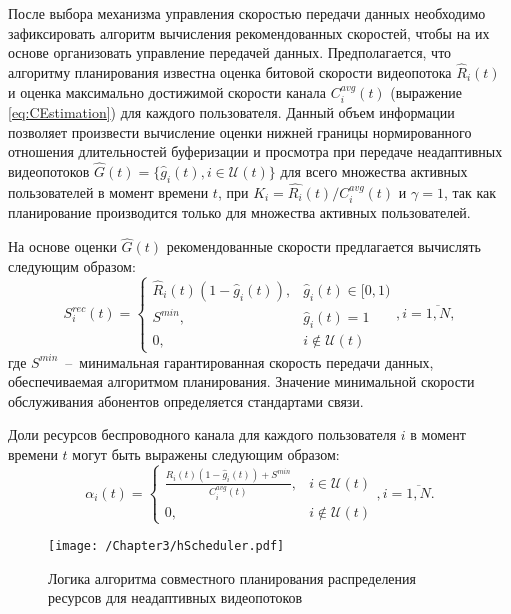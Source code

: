 После выбора механизма управления скоростью передачи данных необходимо зафиксировать алгоритм вычисления рекомендованных скоростей, чтобы на их основе организовать управление передачей данных. Предполагается, что алгоритму планирования известна оценка битовой скорости видеопотока $\hat{R}_i(t)$ и оценка максимально достижимой скорости канала $C^{avg}_i(t)$ (выражение \ref{eq:CEstimation}) для каждого пользователя. Данный объем информации позволяет произвести вычисление оценки нижней границы нормированного отношения длительностей буферизации и просмотра при передаче неадаптивных видеопотоков $\hat{G}(t) = \{\hat{g}_i(t), i \in \mathcal{U}(t)\}$ для всего множества активных пользователей в момент времени $t$, при $K_i = \hat{R_i}(t) / C^{avg}_i(t)$ и $\gamma = 1$, так как планирование производится только для множества активных пользователей.

На основе оценки $\hat{G}(t)$ рекомендованные скорости предлагается вычислять следующим образом:
\begin{equation}
\label{eq:SReqCalc}
S^{rec}_i(t) =
\begin{cases}
\hat{R}_i(t) (1 - \hat{g}_i(t)), & \hat{g}_i(t) \in [0,1) \\
S^{min}, &  \hat{g}_i(t) = 1 \\
0,& i \notin \mathcal{U}(t)
\end{cases}, i = \overline{1,N},
\end{equation}
где $S^{min}$~--~минимальная гарантированная скорость передачи данных, обеспечиваемая алгоритмом планирования. Значение минимальной скорости обслуживания абонентов определяется стандартами связи.

Доли ресурсов беспроводного канала для каждого пользователя $i$ в момент времени $t$ могут быть выражены следующим образом:
$$\alpha_i(t) = \begin{cases}
\frac{\hat{R_i}(t) (1 - \hat{g}_i(t)) + S^{min}}{C^{avg}_i(t)}, & i \in \mathcal{U}(t)  \\
0, & i \notin \mathcal{U}(t)
\end{cases}, i = \overline{1,N}.$$

\begin{figure}[htbp]
\begin{center}
\texttt{[image: /Chapter3/hScheduler.pdf]}
\caption{Логика алгоритма совместного планирования распределения ресурсов для неадаптивных видеопотоков}
\label{fig:HScheduler}
\end{center}
\end{figure}

